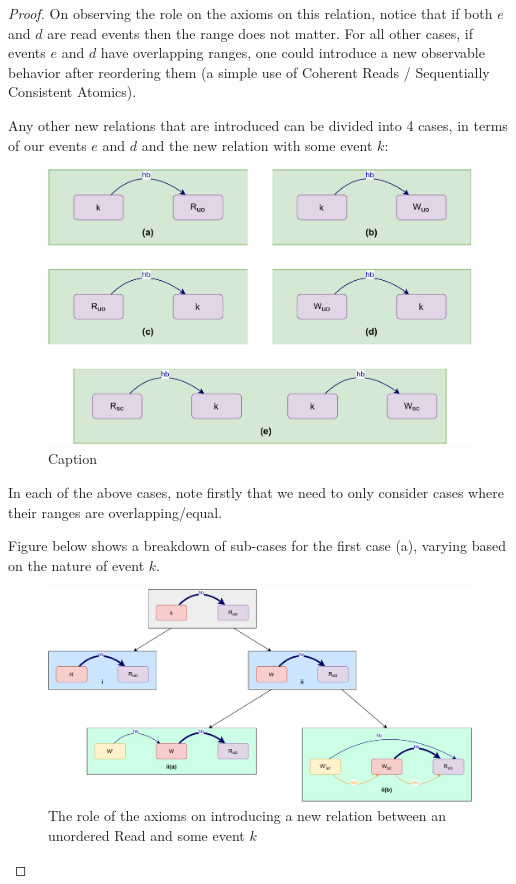 \begin{proof}
        On observing the role on the axioms on this relation, notice that if both $e$ and $d$ are read events then the range does not matter. For all other cases, if events $e$ and $d$ have overlapping ranges, one could introduce a new observable behavior after reordering them (a simple use of Coherent Reads / Sequentially Consistent Atomics).     
        
        Any other new relations that are introduced can be divided into 4 cases, in terms of our events $e$ and $d$ and the new relation with some event $k$:
        \begin{figure}[H]
            \centering
            \includegraphics[scale=0.7]{Q3(a).pdf}
            \caption{Caption}
            \label{fig:my_label}
        \end{figure}
        

        In each of the above cases, note firstly that we need to only consider cases where their ranges are overlapping/equal.
        
        Figure below shows a breakdown of sub-cases for the first case (a), varying based
        on the nature of event $k$.
        \begin{figure}[H]
            \centering
            \includegraphics[scale=0.6]{Q3_(b)Case1.pdf}
            \caption{The role of the axioms on introducing a new relation between an unordered Read and some event $k$}
            \label{fig:my_label}
        \end{figure}
        

\end{proof}
